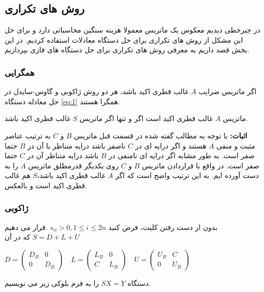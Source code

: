 
	\subsection{روش های تکراری}
	در جبرخطی دیدیم معکوس یک ماتریس معمولا هزینه سنگین محاسباتی دارد و برای حل این مشکل از روش های تکراری برای حل دستگاه معادلات استفاده کردیم. در این بخش قصد داریم به معرفی روش های تکراری برای حل دستگاه های فازی بپردازیم.
	 
	\subsubsection{همگرایی}
	\begin{theorem} 
	\label{thm:3}
		اگر ماتریس ضرایب $ A $ غالب قطری اکید باشد،‌ هر دو روش ژاکوبی و گاوس-سایدل در حل معادله دستگاه \ref{eq:1} همگرا هستند.\cite{second_course}
	\end{theorem}
	\begin{theorem} 
	ماتریس $ A $ غالب قطری اکید است اگر و تنها اگر ماتریس $ S $ غالب قطری اکید باشد. 
	\end{theorem}
	\textbf{اثبات:}
	با توجه به مطالب گفته شده در قسمت قبل ماتریس $ B $ و $ C $ به ترتیب عناصر مثبت و منفی $ A $ هستند و اگر درایه ای در $ C $ ناصفر باشد درایه متناظر با آن در $ B $ حتما صفر است. به طور مشابه اگر درایه ای نامنفی در $ B $ باشد درایه متناظر آن در $ C $ حتما صفر است. در واقع با قراردادن ماتریس $ B $ و $ C $ روی یکدیگر قدرمطلق ماتریس $ A $ را به دست آورده ایم. به این ترتیب واضح است که اگر $ A $ غالب قطری اکید باشد،‌$ S $ هم غالب قطری اکید است و بالعکس.  
	\subsubsection{ژاکوبی}
	بدون از دست رفتن کلیت، فرض کنید 
	$ s_{ii} > 0, 1 \leq i \leq 2n $ 
	.قرار می دهیم 
	$ S = D + L + U $ 
	که در آن  \\
	\begin{center} 
	$
	D = 
	\begin{pmatrix}
	D_B & 0 \\
	0 & D_B
	\end{pmatrix}
	\quad 
	L = 
	\begin{pmatrix}
	L_B & 0 \\
	C & L_B
	\end{pmatrix}
	\quad
	U = 
	\begin{pmatrix}
	U_B & C \\
	0 & U_B
	\end{pmatrix}
	$
	\end{center} 
	دستگاه $ SX = Y $ را به فرم بلوکی زیر می نویسیم. 
	
